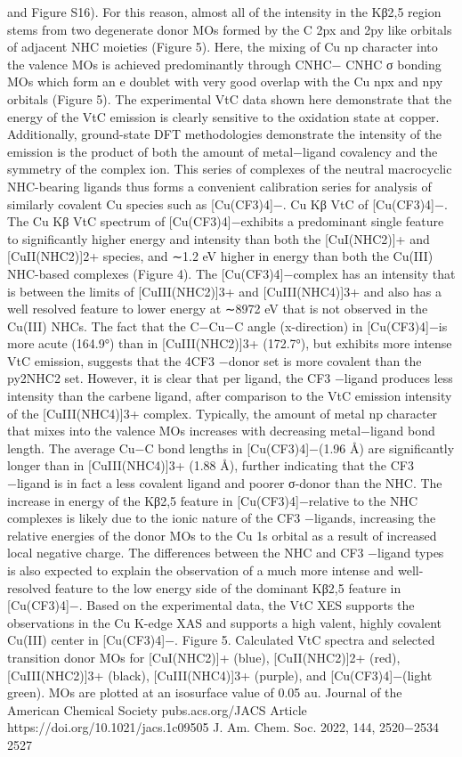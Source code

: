\documentclass{article}
\begin{document}
and Figure S16). For this reason, almost all of the intensity in
the Kβ2,5 region stems from two degenerate donor MOs
formed by the C 2px and 2py like orbitals of adjacent NHC
moieties (Figure 5). Here, the mixing of Cu np character into
the valence MOs is achieved predominantly through CNHC−
CNHC σ bonding MOs which form an e doublet with very good
overlap with the Cu npx and npy orbitals (Figure 5).
The experimental VtC data shown here demonstrate that the
energy of the VtC emission is clearly sensitive to the oxidation
state at copper. Additionally, ground-state DFT methodologies
demonstrate the intensity of the emission is the product of
both the amount of metal−ligand covalency and the symmetry
of the complex ion. This series of complexes of the neutral
macrocyclic NHC-bearing ligands thus forms a convenient
calibration series for analysis of similarly covalent Cu species
such as [Cu(CF3)4]−.
Cu Kβ VtC of [Cu(CF3)4]−. The Cu Kβ VtC spectrum of
[Cu(CF3)4]−exhibits a predominant single feature to
signiﬁcantly higher energy and intensity than both the
[CuI(NHC2)]+ and [CuII(NHC2)]2+ species, and ∼1.2 eV
higher in energy than both the Cu(III) NHC-based complexes
(Figure 4). The [Cu(CF3)4]−complex has an intensity that is
between the limits of [CuIII(NHC2)]3+ and [CuIII(NHC4)]3+
and also has a well resolved feature to lower energy at ∼8972
eV that is not observed in the Cu(III) NHCs. The fact that the
C−Cu−C angle (x-direction) in [Cu(CF3)4]−is more acute
(164.9°) than in [CuIII(NHC2)]3+ (172.7°), but exhibits more
intense VtC emission, suggests that the 4CF3
−donor set is
more covalent than the py2NHC2 set. However, it is clear that
per ligand, the CF3
−ligand produces less intensity than the
carbene ligand, after comparison to the VtC emission intensity
of the [CuIII(NHC4)]3+ complex. Typically, the amount of
metal np character that mixes into the valence MOs increases
with decreasing metal−ligand bond length. The average Cu−C
bond lengths in [Cu(CF3)4]−(1.96 Å) are signiﬁcantly longer
than in [CuIII(NHC4)]3+ (1.88 Å), further indicating that the
CF3
−ligand is in fact a less covalent ligand and poorer σ-donor
than the NHC. The increase in energy of the Kβ2,5 feature in
[Cu(CF3)4]−relative to the NHC complexes is likely due to
the ionic nature of the CF3
−ligands, increasing the relative
energies of the donor MOs to the Cu 1s orbital as a result of
increased local negative charge. The diﬀerences between the
NHC and CF3
−ligand types is also expected to explain the
observation of a much more intense and well-resolved feature
to the low energy side of the dominant Kβ2,5 feature in
[Cu(CF3)4]−. Based on the experimental data, the VtC XES
supports the observations in the Cu K-edge XAS and supports
a high valent, highly covalent Cu(III) center in [Cu(CF3)4]−.
Figure 5. Calculated VtC spectra and selected transition donor MOs
for [CuI(NHC2)]+ (blue), [CuII(NHC2)]2+ (red), [CuIII(NHC2)]3+
(black), [CuIII(NHC4)]3+ (purple), and [Cu(CF3)4]−(light green).
MOs are plotted at an isosurface value of 0.05 au.
Journal of the American Chemical Society
pubs.acs.org/JACS
Article
https://doi.org/10.1021/jacs.1c09505
J. Am. Chem. Soc. 2022, 144, 2520−2534
2527
\end{document}
